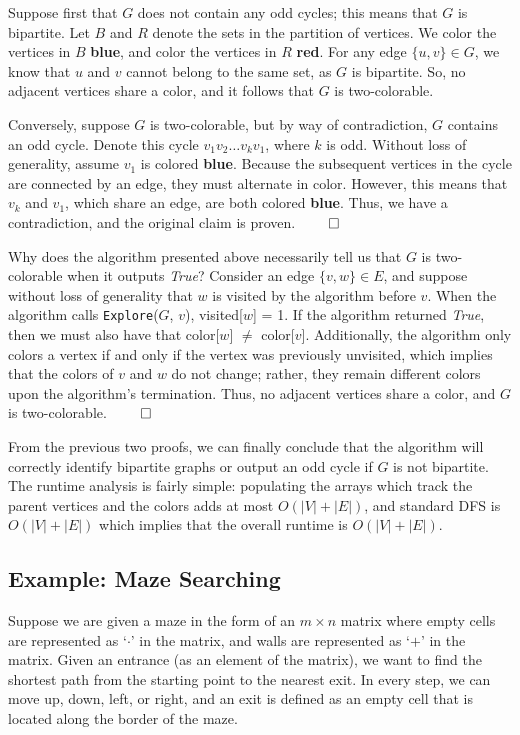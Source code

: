 \documentclass[11pt]{article}
\begin{document}
Suppose first that $G$ does not contain any odd cycles; this means that $G$ is bipartite. Let $B$ and $R$ denote the sets in the partition of vertices. We color the vertices in $B$ \textcolor{DeepSkyBlue3}{\textbf{blue}}, and color the vertices in $R$ \textcolor{Maroon0}{\textbf{red}}. For any edge $\{u, v \} \in G$, we know that $u$ and $v$ cannot belong to the same set, as $G$ is bipartite. So, no adjacent vertices share a color, and it follows that $G$ is two-colorable. 

Conversely, suppose $G$ is two-colorable, but by way of contradiction, $G$ contains an odd cycle. Denote this cycle $v_1v_2\dots v_kv_1$, where $k$ is odd. Without loss of generality, assume $v_1$ is colored \textcolor{DeepSkyBlue3}{\textbf{blue}}. Because the subsequent vertices in the cycle are connected by an edge, they must alternate in color. However, this means that $v_k$ and $v_1$, which share an edge, are both colored \textcolor{DeepSkyBlue3}{\textbf{blue}}. Thus, we have a contradiction, and the original claim is proven. \hfill $\qed$ 

Why does the algorithm presented above necessarily tell us that $G$ is two-colorable when it outputs \emph{True}? Consider an edge $\{v, w\} \in E$, and suppose without loss of generality that $w$ is visited by the algorithm before $v$. When the algorithm calls \texttt{Explore}($G$, $v$), visited[$w$] = 1. If the algorithm returned \emph{True}, then we must also have that color[$w$] $\neq$ color[$v$]. Additionally, the algorithm only colors a vertex if and only if the vertex was previously unvisited, which implies that the colors of $v$ and $w$ do not change; rather, they remain different colors upon the algorithm's termination. Thus, no adjacent vertices share a color, and $G$ is two-colorable. \hfill $\qed$

From the previous two proofs, we can finally conclude that the algorithm will correctly identify bipartite graphs or output an odd cycle if $G$ is not bipartite. The runtime analysis is fairly simple: populating the arrays which track the parent vertices and the colors adds at most $O(|V| + |E|)$, and standard DFS is $O(|V| + |E|)$ which implies that the overall runtime is $O(|V| + |E|)$. 

\subsection{Example: Maze Searching}
Suppose we are given a maze in the form of an $m \times n$ matrix where empty cells are represented as `$\cdot$' in the matrix, and walls are represented as `$+$' in the matrix. Given an entrance (as an element of the matrix), we want to find the shortest path from the starting point to the nearest exit. In every step, we can move up, down, left, or right, and an exit is defined as an empty cell that is located along the border of the maze. 
\end{document}
